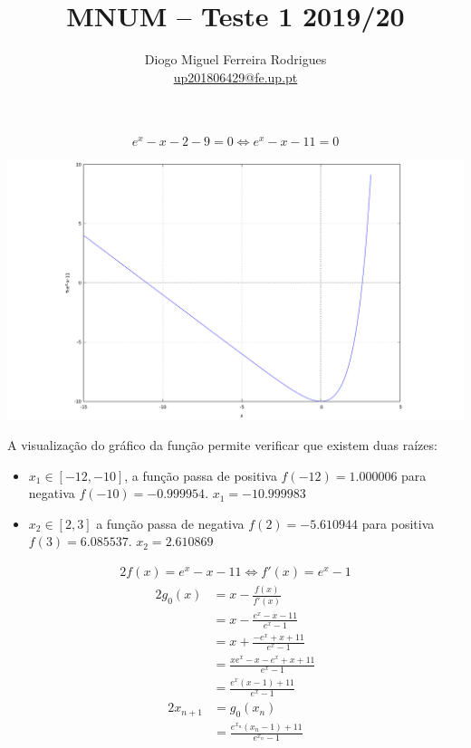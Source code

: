 \documentclass{mnum}
\title{MNUM -- Teste 1 2019/20}
\author{Diogo Miguel Ferreira Rodrigues \\ \href{mailto:up201806429@fe.up.pt}{up201806429@fe.up.pt}}
\begin{document}
\setcounter{chapter}{18}

\begin{equation*}
	e^x-x-2-9=0 \iff e^x-x-11=0
\end{equation*}

\begin{center} \includegraphics[scale=0.32]{2019T1_1a} \end{center}
A visualização do gráfico da função permite verificar que existem duas raízes:
\begin{itemize}
	\item $x_1 \in [-12,-10]$, a função passa de positiva $f(-12)=1.000006$ para negativa $f(-10)=-0.999954$. $x_1 = -10.999983$
	\item $x_2 \in [2,3]$ a função passa de negativa $f(2)=- 5.610944$ para positiva $f(3)=6.085537$. $x_2=2.610869$
\end{itemize}

\begin{alignat*}{2}
f(x)=e^x-x-11 \iff f'(x)=e^x-1
\end{alignat*}
\begin{alignat*}{2}
g_0(x)
&=x-\frac{f(x)}{f'(x)} \\
&=x-\frac{e^x-x-11}{e^x-1}\\
&=x+\frac{-e^x+x+11}{e^x-1}\\
&=\frac{xe^x-x-e^x+x+11}{e^x-1}\\
&=\frac{e^x(x-1)+11}{e^x-1}
\end{alignat*}
\begin{alignat*}{2}
x_{n+1}
&=g_0(x_n) \\
&=\frac{e^{x_n}(x_n-1)+11}{e^{x_n}-1}
\end{alignat*}

\end{document}
